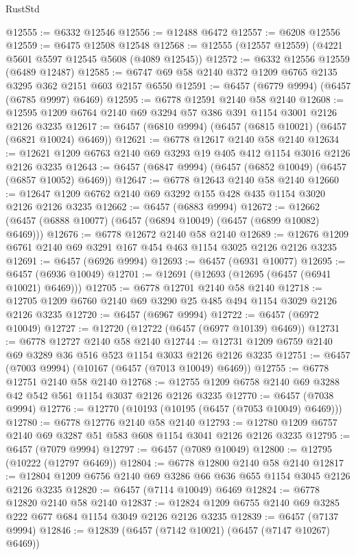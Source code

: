 \begin{lexlean}{RustStd}
\begin{coremodule}
@12555 := @6332 @12546
@12556 := @12488 @6472
@12557 := @6208 @12556
@12559 := @6475 @12508 @12548
@12568 := @12555 (@12557 @12559) (@4221 @5601 @5597 @12545 @5608 (@4089 @12545))
@12572 := @6332 @12556 @12559 (@6489 @12487)
@12585 := @6747 @69 @58 @2140 @372 @1209 @6765 @2135 @3295 @362 @2151 @603 @2157 @6550
@12591 := @6457 (@6779 @9994) (@6457 (@6785 @9997) @6469)
@12595 := @6778 @12591 @2140 @58 @2140
@12608 := @12595 @1209 @6764 @2140 @69 @3294 @57 @386 @391 @1154 @3001 @2126 @2126 @3235
@12617 := @6457 (@6810 @9994) (@6457 (@6815 @10021) (@6457 (@6821 @10024) @6469))
@12621 := @6778 @12617 @2140 @58 @2140
@12634 := @12621 @1209 @6763 @2140 @69 @3293 @19 @405 @412 @1154 @3016 @2126 @2126 @3235
@12643 := @6457 (@6847 @9994) (@6457 (@6852 @10049) (@6457 (@6857 @10052) @6469))
@12647 := @6778 @12643 @2140 @58 @2140
@12660 := @12647 @1209 @6762 @2140 @69 @3292 @155 @428 @435 @1154 @3020 @2126 @2126 @3235
@12662 := @6457 (@6883 @9994)
@12672 := @12662 (@6457 (@6888 @10077) (@6457 (@6894 @10049) (@6457 (@6899 @10082) @6469)))
@12676 := @6778 @12672 @2140 @58 @2140
@12689 := @12676 @1209 @6761 @2140 @69 @3291 @167 @454 @463 @1154 @3025 @2126 @2126 @3235
@12691 := @6457 (@6926 @9994)
@12693 := @6457 (@6931 @10077)
@12695 := @6457 (@6936 @10049)
@12701 := @12691 (@12693 (@12695 (@6457 (@6941 @10021) @6469)))
@12705 := @6778 @12701 @2140 @58 @2140
@12718 := @12705 @1209 @6760 @2140 @69 @3290 @25 @485 @494 @1154 @3029 @2126 @2126 @3235
@12720 := @6457 (@6967 @9994)
@12722 := @6457 (@6972 @10049)
@12727 := @12720 (@12722 (@6457 (@6977 @10139) @6469))
@12731 := @6778 @12727 @2140 @58 @2140
@12744 := @12731 @1209 @6759 @2140 @69 @3289 @36 @516 @523 @1154 @3033 @2126 @2126 @3235
@12751 := @6457 (@7003 @9994) (@10167 (@6457 (@7013 @10049) @6469))
@12755 := @6778 @12751 @2140 @58 @2140
@12768 := @12755 @1209 @6758 @2140 @69 @3288 @42 @542 @561 @1154 @3037 @2126 @2126 @3235
@12770 := @6457 (@7038 @9994)
@12776 := @12770 (@10193 (@10195 (@6457 (@7053 @10049) @6469)))
@12780 := @6778 @12776 @2140 @58 @2140
@12793 := @12780 @1209 @6757 @2140 @69 @3287 @51 @583 @608 @1154 @3041 @2126 @2126 @3235
@12795 := @6457 (@7079 @9994)
@12797 := @6457 (@7089 @10049)
@12800 := @12795 (@10222 (@12797 @6469))
@12804 := @6778 @12800 @2140 @58 @2140
@12817 := @12804 @1209 @6756 @2140 @69 @3286 @66 @636 @655 @1154 @3045 @2126 @2126 @3235
@12820 := @6457 (@7114 @10049) @6469
@12824 := @6778 @12820 @2140 @58 @2140
@12837 := @12824 @1209 @6755 @2140 @69 @3285 @222 @677 @684 @1154 @3049 @2126 @2126 @3235
@12839 := @6457 (@7137 @9994)
@12846 := @12839 (@6457 (@7142 @10021) (@6457 (@7147 @10267) @6469))

\end{coremodule}
\end{lexlean}
